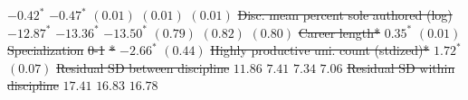 \documentclass[
  10pt,
  letterpaper,
]{article}
\providecommand{\DIFdeltex}[1]{{\protect\color{red}\sout{#1}}}                      %
\providecommand{\DIFdelFL}[1]{\DIFdel{#1}} %
\providecommand{\DIFdel}[1]{\texorpdfstring{\DIFdeltex{#1}}{}} %
\begin{document}
\begin{table}
\DIFdelFL{$-0.42^{*}$  }%
\DIFdelFL{$-0.47^{*}$  }%
\DIFdelFL{$(0.01)$     }%
\DIFdelFL{$(0.01)$     }%
\DIFdelFL{$(0.01)$     }%
\DIFdelFL{Disc. mean percent sole authored (log)  }%
\DIFdelFL{$-12.87^{*}$ }%
\DIFdelFL{$-13.36^{*}$ }%
\DIFdelFL{$-13.50^{*}$ }%
\DIFdelFL{$(0.79)$     }%
\DIFdelFL{$(0.82)$     }%
\DIFdelFL{$(0.80)$     }%
\DIFdelFL{Career length*                          }%
\DIFdelFL{$0.35^{*}$   }%
\DIFdelFL{$(0.01)$     }%
\DIFdelFL{Specialization }%
\DIFdelFL{0-1}%
\DIFdelFL{*                   }%
\DIFdelFL{$-2.66^{*}$  }%
\DIFdelFL{$(0.44)$     }%
\DIFdelFL{Highly productive uni. count (stdized)* }%
\DIFdelFL{$1.72^{*}$   }%
\DIFdelFL{$(0.07)$     }%
\DIFdelFL{Residual SD between discipline          }%
\DIFdelFL{$11.86$     }%
\DIFdelFL{$7.41$       }%
\DIFdelFL{$7.34$       }%
\DIFdelFL{$7.06$       }%
\DIFdelFL{Residual SD within discipline           }%
\DIFdelFL{$17.41$     }%
\DIFdelFL{$16.83$      }%
\DIFdelFL{$16.78$      }%

\end{table}
\end{document}

